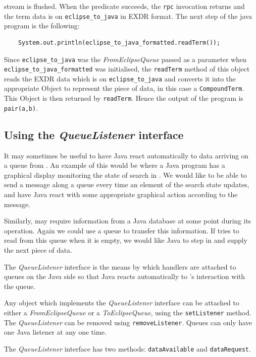 stream is flushed. When the predicate succeeds, the {\tt rpc} invocation
returns and the term data is on {\tt eclipse\_to\_java} in EXDR
format. The next step of the java program is the following:
\begin{verbatim}
    System.out.println(eclipse_to_java_formatted.readTerm());
\end{verbatim}
Since {\tt eclipse\_to\_java} was the {\it FromEclipseQueue} passed as a
parameter when {\tt eclipse\_to\_java\_formatted} was initialised, the
{\tt readTerm} method of this object reads the EXDR data which is on
{\tt eclipse\_to\_java} and converts it into the appropriate Object to
represent the piece of data, in this case a {\tt CompoundTerm}. This Object is
then returned by {\tt readTerm}. Hence the output of the program is
{\tt pair(a,b)}.

\subsection{Using the {\it QueueListener} interface}
\label{sec:ji-queue-listeners}
It may sometimes be useful to have Java react automatically to data
arriving on a queue from {\eclipse}. An example of this would
be where a Java program has a graphical display monitoring the state
of search in {\eclipse}. We would like {\eclipse} to be able to send a
message along a queue every time an element of the search state
updates, and have Java react with some appropriate graphical action
according to the message.

Similarly, {\eclipse} may require information from a Java database at
some point during its operation. Again we could use a queue to
transfer this information. If {\eclipse} tries to read from this queue
when it is empty, we would like Java to step in and supply the next
piece of data. 

The {\it QueueListener} interface is the means by which handlers are
attached to queues on the Java side so that Java reacts
automatically to {\eclipse}'s interaction with the queue.

Any object which implements the {\it QueueListener} interface can be
attached to either a {\it FromEclipseQueue} or a {\it ToEclipseQueue}, using
the {\tt setListener} method. The {\it QueueListener} can be removed
using {\tt removeListener}. Queues can only have one Java
listener at any one time. 

The {\it QueueListener} interface has two methods: {\tt dataAvailable}
and {\tt dataRequest}. 

